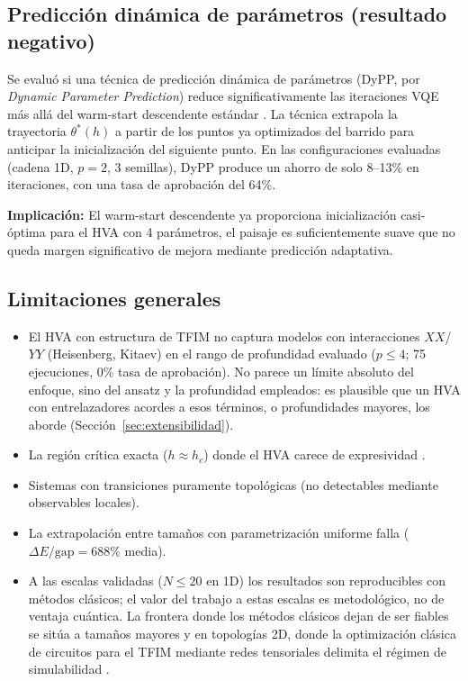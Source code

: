 \documentclass[11pt,a4paper,spanish]{book}
\begin{document}
\subsection{Predicción dinámica de parámetros (resultado negativo)}

Se evaluó si una técnica de predicción dinámica de parámetros (DyPP, por \emph{Dynamic Parameter Prediction}) reduce significativamente las iteraciones VQE más allá del warm-start descendente estándar \citep{puig2025}. La técnica extrapola la trayectoria $\theta^*(h)$ a partir de los puntos ya optimizados del barrido para anticipar la inicialización del siguiente punto. En las configuraciones evaluadas (cadena 1D, $p = 2$, 3 semillas), DyPP produce un ahorro de solo 8--13\% en iteraciones, con una tasa de aprobación del 64\%.

\textbf{Implicación:} El warm-start descendente ya proporciona inicialización casi-óptima para el HVA con 4 parámetros, el paisaje es suficientemente suave \citep{mele2022} que no queda margen significativo de mejora mediante predicción adaptativa.

\subsection{Limitaciones generales}

\begin{itemize}
    \item El HVA con estructura de TFIM no captura modelos con interacciones $XX$/$YY$ (Heisenberg, Kitaev) en el rango de profundidad evaluado ($p \leq 4$; 75 ejecuciones, 0\% tasa de aprobación). No parece un límite absoluto del enfoque, sino del ansatz y la profundidad empleados: es plausible que un HVA con entrelazadores acordes a esos términos, o profundidades mayores, los aborde (Sección~\ref{sec:extensibilidad}).
    \item La región crítica exacta ($h \approx h_c$) donde el HVA carece de expresividad \citep{tripathi2026}.
    \item Sistemas con transiciones puramente topológicas (no detectables mediante observables locales).
    \item La extrapolación entre tamaños con parametrización uniforme falla ($\Delta E/\text{gap} = 688\%$ media).
    \item A las escalas validadas ($N \leq 20$ en 1D) los resultados son reproducibles con métodos clásicos; el valor del trabajo a estas escalas es metodológico, no de ventaja cuántica. La frontera donde los métodos clásicos dejan de ser fiables se sitúa a tamaños mayores y en topologías 2D, donde la optimización clásica de circuitos para el TFIM mediante redes tensoriales delimita el régimen de simulabilidad \citep{martin2026}.
\end{itemize}
\end{document}
